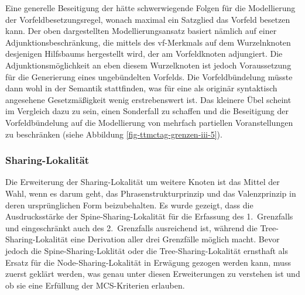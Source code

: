 Eine generelle Beseitigung der  hätte schwerwiegende Folgen für die Modellierung der Vorfeldbesetzungsregel, wonach maximal ein Satzglied das Vorfeld besetzen kann. Der oben dargestellten Modellierungsansatz basiert nämlich auf einer Adjunktionsbeschränkung, die mittels des {\sc vf}-Merkmals auf dem Wurzelnknoten desjenigen Hilfsbaums hergestellt wird, der am Vorfeldknoten adjungiert. Die Adjunktionsmöglichkeit an eben diesem Wurzelknoten ist jedoch Voraussetzung für die Generierung eines ungebündelten Vorfelds. Die Vorfeldbündelung müsste dann wohl in der Semantik stattfinden, was für eine als originär syntaktisch angesehene Gesetzmä\ss igkeit wenig erstrebenswert ist. Das kleinere Übel scheint im Vergleich dazu zu sein, einen Sonderfall zu schaffen und die Beseitigung der Vorfeldbündelung auf die Modellierung von mehrfach partiellen Voranstellungen zu beschränken (siehe Abbildung \ref{fig-ttmctag-grenzen-iii-5}). 


\subsubsection*{Sharing-Lokalität}

Die Erweiterung der Sharing-Lokalität um weitere Knoten ist das Mittel der Wahl, wenn es darum geht, das Phrasenstrukturprinzip und das Valenzprinzip in deren ursprünglichen Form beizubehalten. Es wurde gezeigt, dass die Ausdrucksstärke der Spine-Sharing-Lokalität für die Erfassung des 1.~Grenzfalls und eingeschränkt auch des 2.~Grenzfalls ausreichend ist, während die Tree-Sharing-Lokalität eine Derivation aller drei Grenzfälle möglich macht. Bevor jedoch die Spine-Sharing-Loklität oder die Tree-Sharing-Lokalität ernsthaft als Ersatz für die Node-Sharing-Lokalität in Erwägung gezogen werden kann, muss zuerst geklärt werden, was genau unter diesen Erweiterungen zu verstehen ist und ob sie eine Erfüllung der MCS-Kriterien erlauben.  

